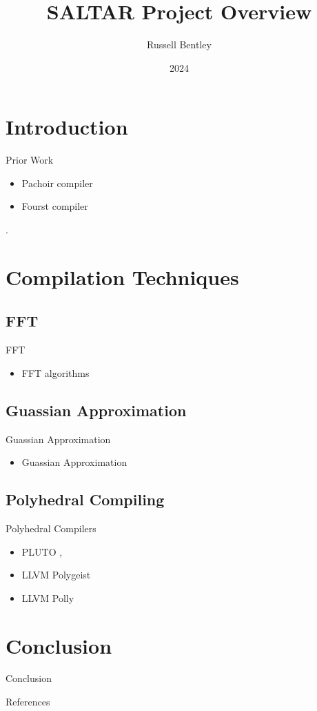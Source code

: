 \documentclass{beamer}
\title{SALTAR Project Overview}
\author{Russell Bentley}
\institute{Stony Brook}
\date{2024}
\begin{document}
\frame{\titlepage}

\section{Introduction}

\begin{frame}{Prior Work}
\begin{itemize}
  \item Pachoir compiler \cite{Tang2011}
  \item Fourst compiler \cite{Ahmad2022}
\end{itemize}.
\end{frame}

\section{Compilation Techniques}
\subsection{FFT}
\begin{frame}{FFT}
\begin{itemize}
  \item FFT algorithms \cite{Ahmad2021} \cite{Ahmad2023} \cite{Ahmad2023}
\end{itemize}
\end{frame}

\subsection{Guassian Approximation}
\begin{frame}{Guassian Approximation}
\begin{itemize}
  \item Guassian Approximation \cite{Ahmad2022Brief}
\end{itemize}
\end{frame}

\subsection{Polyhedral Compiling}
\begin{frame}{Polyhedral Compilers}
\begin{itemize}
  \item PLUTO \cite{Bondhugula2008}, \cite{Bondhugula2008Pract}
  \item LLVM Polygeist \cite{Moses2021} 
  \item LLVM Polly \cite{Grosser2012} 
\end{itemize}
\end{frame}

\section{Conclusion}
\begin{frame}{Conclusion}

\end{frame}

\begin{frame}[allowframebreaks]{References}
    \tiny
    \printbibliography
\end{frame}
\end{document}
